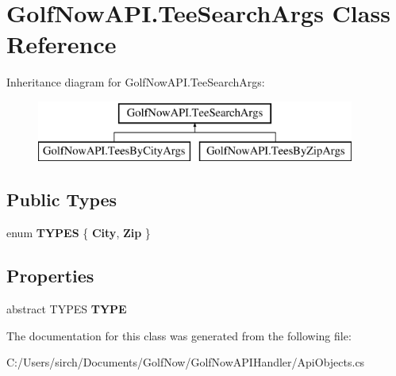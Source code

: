 \hypertarget{class_golf_now_a_p_i_1_1_tee_search_args}{}\section{Golf\+Now\+A\+P\+I.\+Tee\+Search\+Args Class Reference}
\label{class_golf_now_a_p_i_1_1_tee_search_args}
Inheritance diagram for Golf\+Now\+A\+P\+I.\+Tee\+Search\+Args\+:\begin{figure}[H]
\begin{center}
\leavevmode
\includegraphics[height=2.000000cm]{class_golf_now_a_p_i_1_1_tee_search_args}
\end{center}
\end{figure}
\subsection*{Public Types}
\begin{DoxyCompactItemize}
\item 
\mbox{\label{class_golf_now_a_p_i_1_1_tee_search_args_ad76dd82d6771063a54c9d865de9bf704}} 
enum {\bfseries T\+Y\+P\+ES} \{ {\bfseries City}, 
{\bfseries Zip}
 \}
\end{DoxyCompactItemize}
\subsection*{Properties}
\begin{DoxyCompactItemize}
\item 
\mbox{\label{class_golf_now_a_p_i_1_1_tee_search_args_ac2308f76074de6f084694bd5b8262f07}} 
abstract T\+Y\+P\+ES {\bfseries T\+Y\+PE}
\end{DoxyCompactItemize}


The documentation for this class was generated from the following file\+:\begin{DoxyCompactItemize}
\item 
C\+:/\+Users/sirch/\+Documents/\+Golf\+Now/\+Golf\+Now\+A\+P\+I\+Handler/Api\+Objects.\+cs\end{DoxyCompactItemize}
